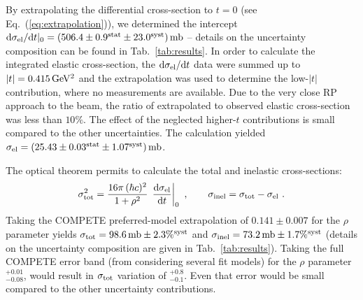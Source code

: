 \documentclass[doublecol]{../macros/epl2}
\def\d{{\rm d}}
\def\un#1{\,{\rm #1}}
\begin{document}
By extrapolating the differential cross-section to $t=0$ (see Eq.~(\ref{eq:extrapolation})), we determined the intercept
$\d\sigma_{\rm el}/\d t|_0 = (506.4 \pm 0.9^{\rm stat} \pm 23.0^{\rm syst})\un{mb}$
-- details on the uncertainty composition can be found in Tab.~\ref{tab:results}. In order to calculate the integrated elastic cross-section, the $\d\sigma_{\rm el}/\d t$ data were summed up to $|t| = 0.415\un{GeV^2}$ and the extrapolation was used to determine the low-$|t|$ contribution, where no measurements are available. Due to the very close RP approach to the beam, the ratio of extrapolated to observed elastic cross-section was less than $10\%$. The effect of the neglected higher-$t$ contributions is small compared to the other uncertainties. The calculation yielded $\sigma_{\rm el} = (25.43 \pm 0.03^{\rm stat} \pm 1.07^{\rm syst})\un{mb}$.

The optical theorem permits to calculate the total and inelastic cross-sections:
\begin{equation}
\label{eq:si tot}
\sigma_{\rm tot}^2 = {16\pi\, (\hbar c)^2\over 1 + \rho^2}\, \left. \d\sigma_{\rm el}\over\d t\right|_0\ ,\qquad
\sigma_{\rm inel} = \sigma_{\rm tot} - \sigma_{\rm el}\ .
\end{equation}
Taking the COMPETE \cite{compete} preferred-model extrapolation of $0.141\pm 0.007$ for the $\rho$ parameter yields
$\sigma_{\rm tot} = 98.6\un{mb}  \pm 2.3\%^{\rm syst}$ and
$\sigma_{\rm inel} = 73.2\un{mb} \pm 1.7\%^{\rm syst}$ (details on the uncertainty composition are given in Tab.~\ref{tab:results}). Taking the full COMPETE error band (from considering several fit models) for the $\rho$ parameter $^{+0.01}_{-0.08}$, would result in $\sigma_{\rm tot}$ variation of $^{+0.8}_{-0.1}$. Even that error would be small compared to the other uncertainty contributions.

 
\end{document}
